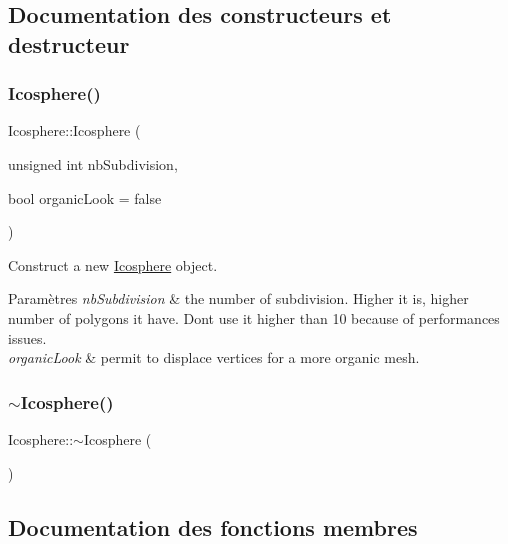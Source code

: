 \subsection{Documentation des constructeurs et destructeur}
\mbox{\label{class_icosphere_a6051bb79f73f5aecb95074118fb019b3}} 
\subsubsection{\texorpdfstring{Icosphere()}{Icosphere()}}
{\footnotesize\ttfamily Icosphere\+::\+Icosphere (\begin{DoxyParamCaption}\item[{unsigned int}]{nb\+Subdivision,  }\item[{bool}]{organic\+Look = {\ttfamily false} }\end{DoxyParamCaption})}



Construct a new \hyperlink{class_icosphere}{Icosphere} object. 


\begin{DoxyParams}{Paramètres}
{\em nb\+Subdivision} & the number of subdivision. Higher it is, higher number of polygons it have. Don\textquotesingle{}t use it higher than 10 because of performances issues. \\
\hline
{\em organic\+Look} & permit to displace vertices for a more organic mesh. \\
\hline
\end{DoxyParams}
\mbox{\label{class_icosphere_ac9473c8c8d6085b6370d95772b898a45}} 
\subsubsection{\texorpdfstring{$\sim$\+Icosphere()}{~Icosphere()}}
{\footnotesize\ttfamily Icosphere\+::$\sim$\+Icosphere (\begin{DoxyParamCaption}{ }\end{DoxyParamCaption})}



\subsection{Documentation des fonctions membres}
\mbox{\label{class_icosphere_af7d6c8c60248794f6a6c382dc5f98a24}} 
